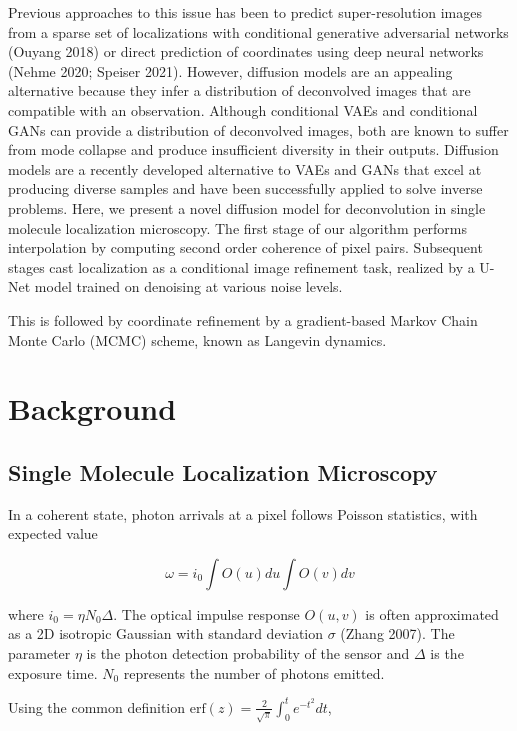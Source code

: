 \documentclass{article}
\begin{document}
Previous approaches to this issue has been to predict super-resolution images from a sparse set of localizations with conditional generative adversarial networks (Ouyang 2018) or direct prediction of coordinates using deep neural networks (Nehme 2020; Speiser 2021). However, diffusion models are an appealing alternative because they infer a distribution of deconvolved images that are compatible with an observation. Although conditional VAEs and conditional GANs can provide a distribution of deconvolved images, both are known to suffer from mode collapse and produce insufficient diversity in their outputs. Diffusion models are a recently developed alternative to VAEs and GANs that excel at producing diverse samples and have been successfully applied to solve inverse problems. Here, we present a novel diffusion model for deconvolution in single molecule localization microscopy. The first stage of our algorithm performs interpolation by computing second order coherence of pixel pairs. Subsequent stages cast localization as a conditional image refinement task, realized by a U-Net model trained on denoising at various noise levels. 

This is followed by coordinate refinement by a gradient-based Markov Chain Monte Carlo (MCMC) scheme, known as Langevin dynamics.


\section{Background}

\subsection{Single Molecule Localization Microscopy}

In a coherent state, photon arrivals at a pixel follows Poisson statistics, with expected value

\begin{equation}
\omega = i_{0}\int O(u)du\int O(v)dv
\end{equation}

where $i_{0} = \eta N_{0}\Delta$. The optical impulse response $O(u,v)$ is often approximated as a 2D isotropic Gaussian with standard deviation $\sigma$ (Zhang 2007). The parameter $\eta$ is the photon detection probability of the sensor and $\Delta$ is the exposure time. $N_{0}$ represents the number of photons emitted.

Using the common definition $\mathrm{erf}(z) = \frac{2}{\sqrt{\pi}}\int_{0}^{t}e^{-t^{2}}dt$,
\end{document}
